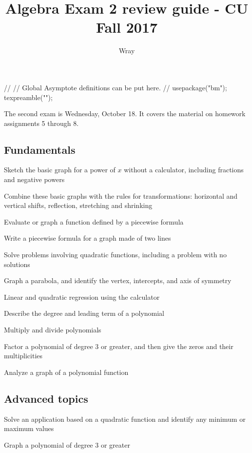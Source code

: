 \documentclass[addpoints, 12pt]{exam}
\title{Algebra Exam 2 review guide - CU Fall 2017}
\author{Wray}
\begin{document}
\begin{asydef}
//
// Global Asymptote definitions can be put here.
//
usepackage("bm");
texpreamble("\def\V#1{\bm{#1}}");
\end{asydef}

\bigskip             
\bigskip

The second exam is Wednesday, October 18.  It covers the material on homework assignments 5 through 8.

\subsection*{Fundamentals}

Sketch the basic graph for a power of $x$ without a calculator, including fractions and negative powers \smallskip

Combine these basic graphs with the rules for transformations: horizontal and vertical shifts, reflection, stretching and shrinking \smallskip

Evaluate or graph a function defined by a piecewise formula

Write a piecewise formula for a graph made of two lines

Solve problems involving quadratic functions, including a problem with no solutions

Graph a parabola, and identify the vertex, intercepts, and axis of symmetry

Linear and quadratic regression using the calculator

Describe the degree and leading term of a polynomial

Multiply and divide polynomials

Factor a polynomial of degree 3 or greater, and then give the zeros and their multiplicities

Analyze a graph of a polynomial function

\subsection*{Advanced topics}

Solve an application based on a quadratic function and identify any minimum or maximum values \smallskip 

Graph a polynomial of degree 3 or greater
\end{document}

